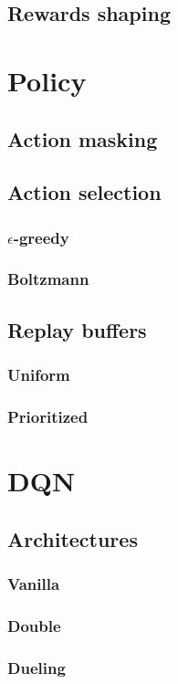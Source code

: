 \documentclass[a4paper,10pt]{report}
\begin{document}
\section{Rewards shaping}

\chapter{Policy}
\section{Action masking}
\section{Action selection}
\subsection{$\epsilon$-greedy}
\subsection{Boltzmann}
\section{Replay buffers}
\subsection{Uniform}
\subsection{Prioritized}

\chapter{DQN}
\section{Architectures}
\subsection{Vanilla}
\subsection{Double}
\subsection{Dueling}
\end{document}
